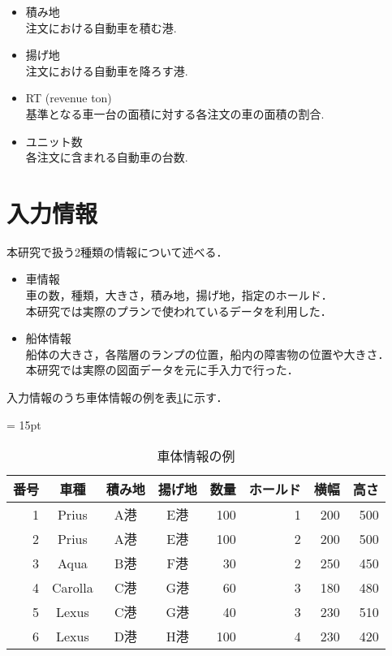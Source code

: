 \begin{itemize}
    \item 積み地 \\
    注文における自動車を積む港.

    \item 揚げ地 \\
    注文における自動車を降ろす港.

    \item  RT (revenue ton) \\
    基準となる車一台の面積に対する各注文の車の面積の割合. 

    \item ユニット数 \\
    各注文に含まれる自動車の台数.
\end{itemize}


\section{入力情報}
本研究で扱う2種類の情報について述べる．

\begin{itemize}
    \item 車情報 \\
    車の数，種類，大きさ，積み地，揚げ地，指定のホールド．\\
    本研究では実際のプランで使われているデータを利用した．
    \item 船体情報 \\
    船体の大きさ，各階層のランプの位置，船内の障害物の位置や大きさ．\\
    本研究では実際の図面データを元に手入力で行った．

\end{itemize}
入力情報のうち車体情報の例を表\ref{table21}に示す．

\begin{table}[htbp]
    \tabcolsep = 15pt
    \renewcommand{\arraystretch}{0.8}
    \caption{車体情報の例}
    \label{table21}
    \begin{center}
    \begin{tabular}{rcccrrrr} \hline
    番号 & 車種 & 積み地 & 揚げ地 & 数量 & ホールド & 横幅 & 高さ \\ \hline
    1 & Prius & A港 & E港 & 100 & 1 & 200 & 500 \\
    2 & Prius & A港 & E港 & 100 & 2 & 200 & 500 \\
    3 & Aqua & B港 & F港 & 30 & 2 & 250 & 450 \\
    4 & Carolla & C港 & G港 & 60 & 3 & 180 & 480 \\
    5 & Lexus & C港 & G港 & 40 & 3 & 230 & 510 \\
    6 & Lexus & D港 & H港 & 100 & 4 & 230 & 420 \\
    \hline
    \end{tabular}
    \end{center}
    \end{table}

